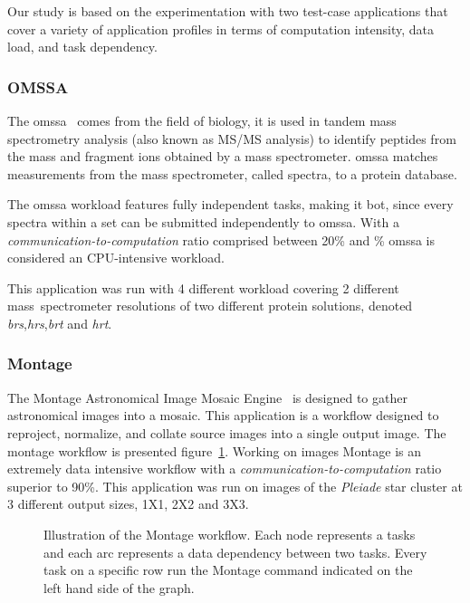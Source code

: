 Our study is  based on the experimentation with two  test-case applications that
cover a variety of application profiles  in terms of computation intensity, data
load, and task dependency.

\subsubsection{OMSSA}

The \ac{omssa}~\cite{Geer2004}  comes from the  field of  biology, it is  used in
tandem mass  spectrometry analysis  (also known as  MS/MS analysis)  to identify
peptides   from   the   mass   and    fragment   ions   obtained   by   a   mass
spectrometer. \ac{omssa} matches measurements from the mass spectrometer, called
spectra, to a protein database.

The \ac{omssa}  workload features fully  independent tasks, making  it \ac{bot},
since every spectra  within a set can be submitted  independently to \ac{omssa}.
With a  \emph{communication-to-computation} ratio comprised between  20\% and \%
\ac{omssa} is considered an CPU-intensive workload.

This application was run with 4 different workload covering 2 different
mass~spectrometer resolutions of two different protein solutions, denoted
\emph{brs},\emph{hrs},\emph{brt} and \emph{hrt}.

\subsubsection{Montage}

The Montage  Astronomical Image Mosaic Engine~\cite{montage2009}  is designed to
gather  astronomical images  into  a  mosaic.  This  application  is a  workflow
designed to reproject, normalize, and collate source images into a single output
image. The montage workflow  is presented figure~\ref{fig:montagewf}. Working on
images   Montage   is   an   extremely    data   intensive   workflow   with   a
\emph{communication-to-computation} ratio superior to 90\%. This application was
run on  images of the \emph{Pleiade}  star cluster at 3  different output sizes,
1X1, 2X2 and 3X3.

\begin{figure}[ht]
	
	\caption{Illustration of the Montage workflow. Each node represents a
	tasks and each arc represents a data dependency between two tasks. Every
	task on a specific row run the Montage command indicated on the left
	hand side of the graph.}
	\label{fig:montagewf}
\end{figure}

